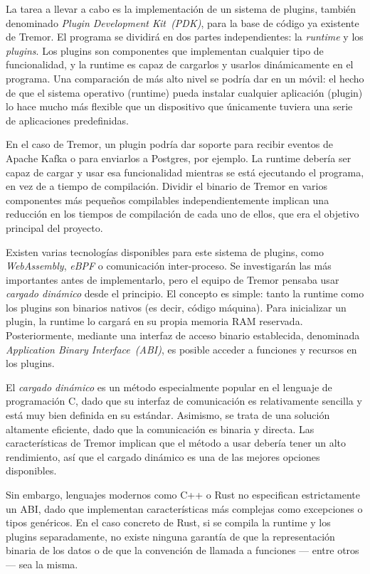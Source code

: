 La tarea a llevar a cabo es la implementación de un sistema de plugins, también
denominado \emph{Plugin Development Kit~(PDK)}, para la base de código ya
existente de Tremor. El programa se dividirá en dos partes independientes: la
\emph{runtime} y los \emph{plugins}. Los plugins son componentes que implementan
cualquier tipo de funcionalidad, y la runtime es capaz de cargarlos y usarlos
dinámicamente en el programa. Una comparación de más alto nivel se podría dar en
un móvil: el hecho de que el sistema operativo (runtime) pueda instalar
cualquier aplicación (plugin) lo hace mucho más flexible que un dispositivo que
únicamente tuviera una serie de aplicaciones predefinidas.

En el caso de Tremor, un plugin podría dar soporte para recibir eventos de
Apache Kafka o para enviarlos a Postgres, por ejemplo. La runtime debería ser
capaz de cargar y usar esa funcionalidad mientras se está ejecutando el
programa, en vez de a tiempo de compilación. Dividir el binario de Tremor en
varios componentes más pequeños compilables independientemente implican una
reducción en los tiempos de compilación de cada uno de ellos, que era el
objetivo principal del proyecto.

Existen varias tecnologías disponibles para este sistema de plugins, como
\emph{WebAssembly}, \emph{eBPF} o comunicación inter-proceso. Se investigarán
las más importantes antes de implementarlo, pero el equipo de Tremor pensaba
usar \emph{cargado dinámico} desde el principio. El concepto es simple: tanto la
runtime como los plugins son binarios nativos (es decir, código máquina). Para
inicializar un plugin, la runtime lo cargará en su propia memoria RAM reservada.
Posteriormente, mediante una interfaz de acceso binario establecida, denominada
\emph{Application Binary Interface~(ABI)}, es posible acceder a funciones y
recursos en los plugins.

El \emph{cargado dinámico} es un método especialmente popular en el lenguaje de
programación C, dado que su interfaz de comunicación es relativamente sencilla y
está muy bien definida en su estándar. Asimismo, se trata de una solución
altamente eficiente, dado que la comunicación es binaria y directa. Las
características de Tremor implican que el método a usar debería tener un alto
rendimiento, así que el cargado dinámico es una de las mejores opciones
disponibles.

Sin embargo, lenguajes modernos como C++ o Rust no especifican estrictamente un
ABI, dado que implementan características más complejas como excepciones o tipos
genéricos. En el caso concreto de Rust, si se compila la runtime y los plugins
separadamente, no existe ninguna garantía de que la representación binaria de
los datos o de que la convención de llamada a funciones --- entre otros --- sea
la misma.

